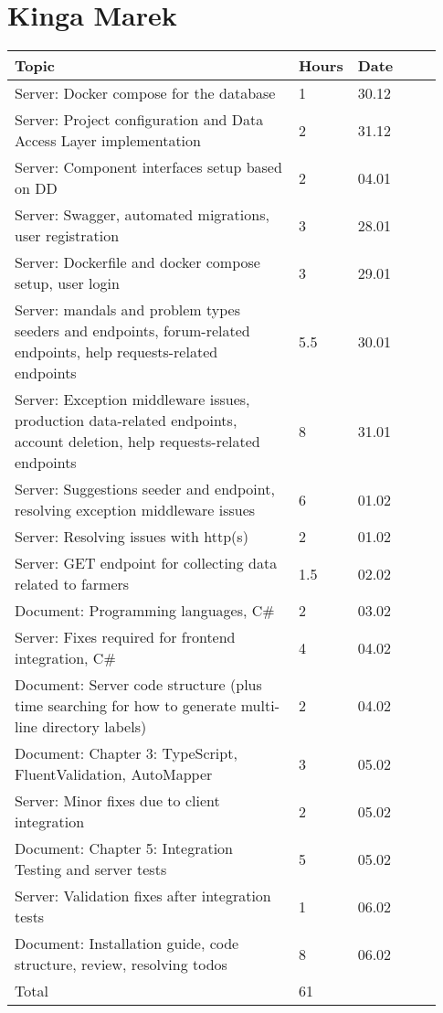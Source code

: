 \section*{Kinga Marek}
\begin{longtable}{@{}p{0.67\linewidth} p{0.06\linewidth} p{0.20\linewidth}@{}}
    \toprule[1.5pt]
    Topic &  Hours & Date \\ \hline
    Server: Docker compose for the database & 1 & 30.12 \\
    Server: Project configuration and Data Access Layer implementation & 2 & 31.12 \\
    Server: Component interfaces setup based on DD & 2 &  04.01 \\
    Server: Swagger, automated migrations, user registration & 3 &  28.01 \\
    Server: Dockerfile and docker compose setup, user login & 3 &  29.01 \\
    Server: mandals and problem types seeders and endpoints, forum-related endpoints, help requests-related endpoints & 5.5 &  30.01 \\
    Server: Exception middleware issues, production data-related endpoints, account deletion, help requests-related endpoints & 8 &  31.01 \\
    Server: Suggestions seeder and endpoint, resolving exception middleware issues & 6 &  01.02 \\
    Server: Resolving issues with http(s) & 2 &  01.02 \\
    Server: GET endpoint for collecting data related to farmers & 1.5 &  02.02 \\  
    Document: Programming languages, C\# & 2 &  03.02 \\
    Server: Fixes required for frontend integration, C\# & 4 &  04.02 \\
    Document: Server code structure (plus time searching for how to generate multi-line directory labels) & 2 &  04.02 \\
    Document:  Chapter 3: TypeScript, FluentValidation, AutoMapper & 3 &  05.02 \\
    Server:  Minor fixes due to client integration & 2 &  05.02 \\
    Document: Chapter 5: Integration Testing and server tests & 5 &  05.02 \\
    Server: Validation fixes after integration tests & 1 &  06.02 \\
    Document: Installation guide, code structure, review, resolving todos & 8 &  06.02 \\
    \hline
    Total & 61 & \\ 
    \bottomrule[1.5pt]
\end{longtable}
